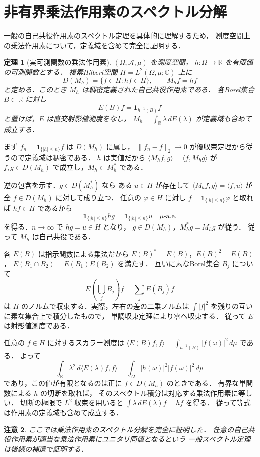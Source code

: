 \documentclass[a5paper,10pt,onecolumn]{jsarticle}
\makeatletter
\theoremstyle{mathnotetheorem}
\newtheorem{theorem}{定理}[section]
\newtheorem{remark}[theorem]{注意}
\renewcommand{\proofname}{証明}
\renewenvironment{proof}[1][\proofname]{%
  \par\pushQED{\qed}\normalfont\topsep4\p@\@plus2\p@\relax
  \trivlist\item[\hskip\labelsep\bfseries #1]\ignorespaces
}{\popQED\endtrivlist\@endpefalse}
\newcommand{\norm}[1]{\lVert #1\rVert}
\makeatother
\begin{document}
\section{非有界乗法作用素のスペクトル分解}
一般の自己共役作用素のスペクトル定理を具体的に理解するため，
測度空間上の乗法作用素について，定義域を含めて完全に証明する．
\begin{theorem}[実可測関数の乗法作用素]
$(\Omega,\mathcal A,\mu)$ を測度空間，
$h:\Omega\to\mathbb R$ を有限値の可測関数とする．
複素Hilbert空間 $H=L^2(\Omega,\mu;\mathbb C)$ 上に
\[
 D(M_h)=\{f\in H:hf\in H\},\qquad M_hf=hf
\]
と定める．このとき $M_h$ は稠密定義された自己共役作用素である．
各Borel集合 $B\subset\mathbb R$ に対し
\[
 E(B)f=\mathbf1_{h^{-1}(B)}f
\]
と置けば，$E$ は直交射影値測度をなし，
$M_h=\int_{\mathbb R}\lambda\,dE(\lambda)$ が定義域も含めて成立する．
\end{theorem}
\begin{proof}
まず $f_n=\mathbf1_{\{|h|\le n\}}f$ は $D(M_h)$ に属し，
$\norm{f_n-f}_2\to0$ が優収束定理から従うので定義域は稠密である．
$h$ は実値だから $\langle M_hf,g\rangle=\langle f,M_hg\rangle$
が $f,g\in D(M_h)$ で成立し，$M_h\subset M_h^*$ である．

逆の包含を示す．$g\in D(M_h^*)$ なら
ある $u\in H$ が存在して
$\langle M_hf,g\rangle=\langle f,u\rangle$ が
全 $f\in D(M_h)$ に対して成り立つ．
任意の $\varphi\in H$ に対し
$f=\mathbf1_{\{|h|\le n\}}\varphi$ と取れば
$hf\in H$ であるから
\[
 \mathbf1_{\{|h|\le n\}}hg
 =\mathbf1_{\{|h|\le n\}}u\quad\mu\text{-a.e.}
\]
を得る．$n\to\infty$ で $hg=u\in H$ となり，
$g\in D(M_h)$，$M_h^*g=M_hg$ が従う．
従って $M_h$ は自己共役である．

各 $E(B)$ は指示関数による乗法だから
$E(B)^*=E(B)$，$E(B)^2=E(B)$，
$E(B_1\cap B_2)=E(B_1)E(B_2)$ を満たす．
互いに素なBorel集合 $B_j$ について
\[
 E\!\left(\bigcup_jB_j\right)f
 =\sum_jE(B_j)f
\]
は $H$ のノルムで収束する．実際，左右の差の二乗ノルムは
$\int|f|^2$ を残りの互いに素な集合上で積分したもので，
単調収束定理により零へ収束する．
従って $E$ は射影値測度である．

任意の $f\in H$ に対するスカラー測度は
$\langle E(B)f,f\rangle=
 \int_{h^{-1}(B)}|f(\omega)|^2\,d\mu$ である．
よって
\[
 \int_{\mathbb R}\lambda^2\,d\langle E(\lambda)f,f\rangle
 =\int_\Omega|h(\omega)|^2|f(\omega)|^2\,d\mu
\]
であり，この値が有限となるのは正に $f\in D(M_h)$ のときである．
有界な単関数による $h$ の切断を取れば，
そのスペクトル積分は対応する乗法作用素に等しい．
切断の極限で $L^2$ 収束を用いると
$\int\lambda\,dE(\lambda)f=hf$ を得る．
従って等式は作用素の定義域も含めて成立する．
\end{proof}
\begin{remark}
ここでは乗法作用素のスペクトル分解を完全に証明した．
任意の自己共役作用素が適当な乗法作用素にユニタリ同値となるという
一般スペクトル定理は後続の補遺で証明する．
\end{remark}
\end{document}
